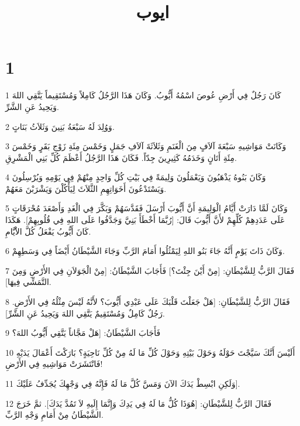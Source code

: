 

\title{ايوب}


\chapter{1}

\par 1 كَانَ رَجُلٌ فِي أَرْضِ عُوصَ اسْمُهُ أَيُّوبُ. وَكَانَ هَذَا الرَّجُلُ كَامِلاً وَمُسْتَقِيماً يَتَّقِي اللهَ وَيَحِيدُ عَنِ الشَّرِّ.
\par 2 وَوُلِدَ لَهُ سَبْعَةُ بَنِينَ وَثَلاَثُ بَنَاتٍ.
\par 3 وَكَانَتْ مَوَاشِيهِ سَبْعَةَ آلاَفٍ مِنَ الْغَنَمِ وَثَلاَثَةَ آلاَفِ جَمَلٍ وَخَمْسَ مِئَةِ زَوْجِ بَقَرٍ وَخَمْسَ مِئَةِ أَتَانٍ وَخَدَمُهُ كَثِيرِينَ جِدّاً. فَكَانَ هَذَا الرَّجُلُ أَعْظَمَ كُلِّ بَنِي الْمَشْرِقِ.
\par 4 وَكَانَ بَنُوهُ يَذْهَبُونَ وَيَعْمَلُونَ وَلِيمَةً فِي بَيْتِ كُلِّ وَاحِدٍ مِنْهُمْ فِي يَوْمِهِ وَيُرْسِلُونَ وَيَسْتَدْعُونَ أَخَوَاتِهِمِ الثَّلاَثَ لِيَأْكُلْنَ وَيَشْرَبْنَ مَعَهُمْ.
\par 5 وَكَانَ لَمَّا دَارَتْ أَيَّامُ الْوَلِيمَةِ أَنَّ أَيُّوبَ أَرْسَلَ فَقَدَّسَهُمْ وَبَكَّرَ فِي الْغَدِ وَأَصْعَدَ مُحْرَقَاتٍ عَلَى عَدَدِهِمْ كُلِّهِمْ لأَنَّ أَيُّوبَ قَالَ: [رُبَّمَا أَخْطَأَ بَنِيَّ وَجَدَّفُوا عَلَى اللهِ فِي قُلُوبِهِمْ]. هَكَذَا كَانَ أَيُّوبُ يَفْعَلُ كُلَّ الاَْيَّامِ.
\par 6 وَكَانَ ذَاتَ يَوْمٍ أَنَّهُ جَاءَ بَنُو اللهِ لِيَمْثُلُوا أَمَامَ الرَّبِّ وَجَاءَ الشَّيْطَانُ أَيْضَاً فِي وَسَطِهِمْ.
\par 7 فَقَالَ الرَّبُّ لِلشَّيْطَانِ: [مِنْ أَيْنَ جِئْتَ؟] فَأَجَابَ الشَّيْطَانُ: [مِنْ الْجَوَلاَنِ فِي الأَرْضِ وَمِنَ التَّمَشِّي فِيهَا].
\par 8 فَقَالَ الرَّبُّ لِلشَّيْطَانِ: [هَلْ جَعَلْتَ قَلْبَكَ عَلَى عَبْدِي أَيُّوبَ؟ لأَنَّهُ لَيْسَ مِثْلُهُ فِي الأَرْضِ. رَجُلٌ كَامِلٌ وَمُسْتَقِيمٌ يَتَّقِي اللهَ وَيَحِيدُ عَنِ الشَّرِّ].
\par 9 فَأَجَابَ الشَّيْطَانُ: [هَلْ مَجَّاناً يَتَّقِي أَيُّوبُ اللهَ؟
\par 10 أَلَيْسَ أَنَّكَ سَيَّجْتَ حَوْلَهُ وَحَوْلَ بَيْتِهِ وَحَوْلَ كُلِّ مَا لَهُ مِنْ كُلِّ نَاحِيَةٍ؟ بَارَكْتَ أَعْمَالَ يَدَيْهِ فَانْتَشَرَتْ مَوَاشِيهِ فِي الأَرْضِ!
\par 11 وَلَكِنِ ابْسِطْ يَدَكَ الآنَ وَمَسَّ كُلَّ مَا لَهُ فَإِنَّهُ فِي وَجْهِكَ يُجَدِّفُ عَلَيْكَ].
\par 12 فَقَالَ الرَّبُّ لِلشَّيْطَانِ: [هُوَذَا كُلُّ مَا لَهُ فِي يَدِكَ وَإِنَّمَا إِلَيهِ لاَ تَمُدَّ يَدَكَ]. ثمَّ خَرَجَ الشَّيْطَانُ مِنْ أَمَامِ وَجْهِ الرَّبِّ.

